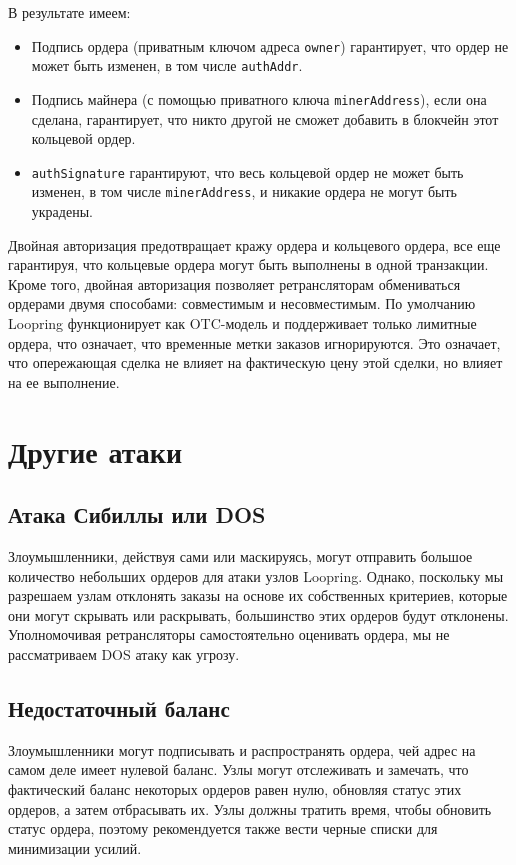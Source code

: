 \documentclass[utf8,nofonts]{article}
\begin{document}
\begin{multicols}{2}
\begin{enumerate}
			\end{enumerate}
			В результате имеем:
			\begin{itemize}
			\item Подпись ордера (приватным ключом адреса \verb|owner|) гарантирует, что ордер не может быть изменен, в том числе \verb|authAddr|.
			\item Подпись майнера (с помощью приватного ключа \verb|minerAddress|), если она сделана, гарантирует, что никто другой не сможет добавить в блокчейн этот кольцевой ордер.
			\item \verb|authSignature| гарантируют, что весь кольцевой ордер не может быть изменен, в том числе \verb|minerAddress|, и никакие ордера не могут быть украдены.
			\end{itemize}
			Двойная авторизация предотвращает кражу ордера и кольцевого ордера, все еще гарантируя, что кольцевые ордера могут быть выполнены в одной транзакции. Кроме того, двойная авторизация позволяет ретрансляторам обмениваться ордерами двумя способами: совместимым и несовместимым. По умолчанию Loopring функционирует как OTC-модель и поддерживает только лимитные ордера, что означает, что временные метки заказов игнорируются. Это означает, что опережающая сделка не влияет на фактическую цену этой сделки, но влияет на ее выполнение.
			\section{Другие атаки}
			\subsection{Атака Сибиллы или DOS}
			Злоумышленники, действуя сами или маскируясь, могут отправить большое количество небольших ордеров для атаки узлов Loopring. Однако, поскольку мы разрешаем узлам отклонять заказы на основе их собственных критериев, которые они могут скрывать или раскрывать, большинство этих ордеров будут отклонены. Уполномочивая ретрансляторы самостоятельно оценивать ордера, мы не рассматриваем DOS атаку как угрозу.
			\subsection{Недостаточный баланс}
			Злоумышленники могут подписывать и распространять ордера, чей адрес на самом деле имеет нулевой баланс. Узлы могут отслеживать и замечать, что фактический баланс некоторых ордеров равен нулю, обновляя статус этих ордеров, а затем отбрасывать их.
			Узлы должны тратить время, чтобы обновить статус ордера, поэтому рекомендуется также вести черные списки для минимизации усилий.

\end{multicols}
\end{document}
